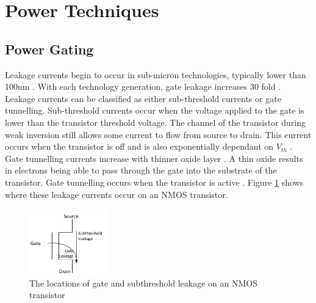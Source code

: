 
\section{Power Techniques}
\subsection{Power Gating}



Leakage currents begin to occur in sub-micron technologies, typically lower than 100nm \cite{bsoul2010fpga, nair2009comparative}.
With each technology generation, gate leakage increases 30 fold \cite{bernstein2003design}.
Leakage currents can be classified as either sub-threshold currents or gate tunnelling. 
Sub-threshold currents occur when the voltage applied to the gate is lower than the transistor threshold voltage. 
The channel of the transistor during weak inversion still allows some current to flow from source to drain.
This current occurs when the transistor is off and is also exponentially dependant on $V_{th}$ \cite{borkar1999design}.
Gate tunnelling currents increase with thinner oxide layer \cite{m2002international}. 
A thin oxide results in electrons being able to pass through the gate into the substrate of the transistor. 
Gate tunnelling occurs when the transistor is active \cite{nair2009comparative}.
Figure \ref{fig:leakage} shows where these leakage currents occur on an NMOS transistor.

\begin{figure}
\centering
\includegraphics[width=0.3\textwidth]{Figures/leakage.pdf}
\caption{The locations of gate and subthreshold leakage on an NMOS transistor}
\label{fig:leakage}
\end{figure}



